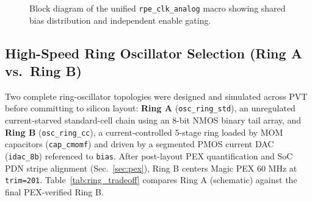 \documentclass[10pt,a4paper]{article}
\begin{document}
\begin{figure}[H]
{%
}
\caption{Block diagram of the unified \texttt{rpe\_clk\_analog} macro showing shared bias distribution and independent enable gating.}
\label{fig:macro_arch}
\end{figure}

\subsection{High-Speed Ring Oscillator Selection (Ring A vs.\ Ring B)}
Two complete ring-oscillator topologies were designed and simulated across PVT before committing to silicon layout: \textbf{Ring A} (\texttt{osc\_ring\_std}), an unregulated current-starved standard-cell chain using an 8-bit NMOS binary tail array, and \textbf{Ring B} (\texttt{osc\_ring\_cc}), a current-controlled 5-stage ring loaded by MOM capacitors (\texttt{cap\_cmomf}) and driven by a segmented PMOS current DAC (\texttt{idac\_8b}) referenced to \texttt{bias}. After post-layout PEX quantification and SoC PDN stripe alignment (Sec.~\ref{sec:pex}), Ring B centers Magic PEX $60\text{ MHz}$ at \texttt{trim=201}. Table~\ref{tab:ring_tradeoff} compares Ring A (schematic) against the final PEX-verified Ring B.
\end{document}
